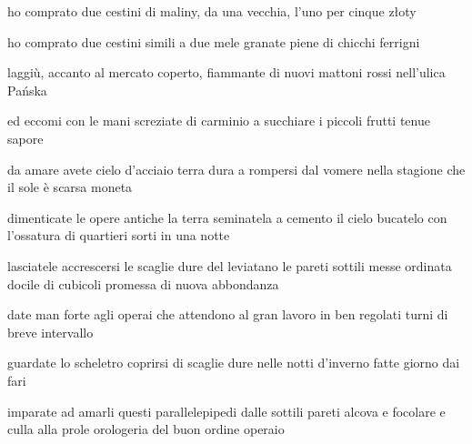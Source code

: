 \begin{poem}
	\begin{stanza}
		ho comprato due cestini\verseline
		di maliny, da una vecchia,\verseline
		l’uno per cinque złoty
	\end{stanza}

	\begin{stanza}
		ho comprato due cestini\verseline
		simili a due mele granate\verseline
		piene di chicchi ferrigni
	\end{stanza}

	\begin{stanza}
		laggiù, accanto al mercato\verseline
		coperto, fiammante di nuovi mattoni rossi\verseline
		nell'ulica Pańska
	\end{stanza}

	\begin{stanza}
		ed eccomi\verseline
		con le mani screziate di carminio\verseline
		a succhiare i piccoli frutti\verseline
		tenue sapore
	\end{stanza}
\end{poem}

\clearpage


\begin{poem}
	\begin{stanza}
		da amare avete cielo d'acciaio\verseline
		terra dura a rompersi\verseline
		dal vomere nella stagione\verseline
		che il sole è scarsa moneta
	\end{stanza}

	\begin{stanza}
		dimenticate le opere antiche\verseline
		la terra seminatela a cemento\verseline
		il cielo bucatelo con l'ossatura\verseline
		di quartieri sorti in una notte
	\end{stanza}

	\begin{stanza}
		lasciatele accrescersi le scaglie\verseline
		dure del leviatano le pareti sottili\verseline
		messe ordinata docile di cubicoli\verseline
		promessa di nuova abbondanza
	\end{stanza}

	\begin{stanza}
		date man forte agli operai\verseline
		che attendono al gran lavoro\verseline
		in ben regolati turni\verseline
		di breve intervallo
	\end{stanza}

	\begin{stanza}
		guardate lo scheletro\verseline
		coprirsi di scaglie dure\verseline
		nelle notti d'inverno\verseline
		fatte giorno dai fari
	\end{stanza}

	\begin{stanza}
		imparate ad amarli questi\verseline
		parallelepipedi dalle sottili pareti\verseline
		alcova e focolare e culla alla prole\verseline
		orologeria del buon ordine operaio
	\end{stanza}
\end{poem}

